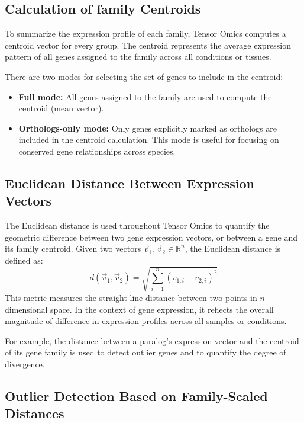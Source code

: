 \documentclass[11pt]{article}
\begin{document}
\subsection{Calculation of family Centroids}
\label{sec:family_centroids}

To summarize the expression profile of each family, Tensor Omics computes a
centroid vector for every group. The centroid represents the average expression
pattern of all genes assigned to the family across all conditions or tissues.

\vspace{0.2cm}
\noindent
There are two modes for selecting the set of genes to include in the centroid:
\begin{itemize}
	\item \textbf{Full mode:} All genes assigned to the family are used to
	      compute the centroid (mean vector).
	      
	\item \textbf{Orthologs-only mode:} Only genes explicitly marked as
	      orthologs are included in the centroid calculation. This mode is useful for
	      focusing on conserved gene relationships across species.
\end{itemize}

\subsection{Euclidean Distance Between Expression Vectors}
\label{sec:euclidean_distance}

The Euclidean distance is used throughout Tensor Omics to quantify the
geometric difference between two gene expression vectors, or between a gene and
its family centroid. Given two vectors
$\vec{v}_{1}, \vec{v}_{2} \in \mathbb{R}^{n}$, the Euclidean distance is defined
as:
\[
	d(\vec{v}_{1}, \vec{v}_{2}) = \sqrt{\sum_{i=1}^{n} (v_{1,i}- v_{2,i})^{2}}
\]
This metric measures the straight-line distance between two points in $n$-dimensional
space. In the context of gene expression, it reflects the overall magnitude of
difference in expression profiles across all samples or conditions.

\noindent
For example, the distance between a paralog's expression vector and the centroid
of its gene family is used to detect outlier genes and to quantify the degree of
divergence.

\subsection{Outlier Detection Based on Family-Scaled Distances}
\label{sec:outlier_detection_algorithm}
\end{document}
